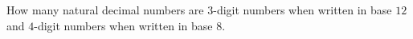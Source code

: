 How many natural decimal numbers are $3$-digit numbers when written in base $12$ and $4$-digit numbers when written in base $8$. 
